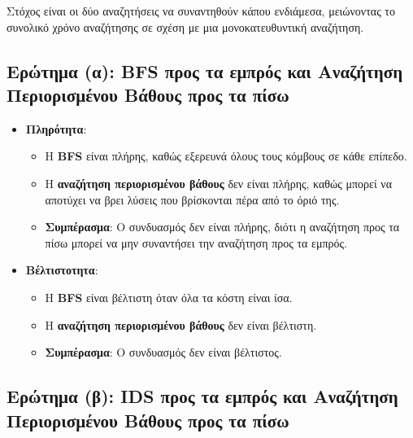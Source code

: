 \documentclass{article}
\begin{document}
Στόχος είναι οι δύο αναζητήσεις να συναντηθούν κάπου ενδιάμεσα, μειώνοντας το συνολικό χρόνο αναζήτησης σε σχέση με μια μονοκατευθυντική αναζήτηση.

\subsection*{Ερώτημα (α): BFS προς τα εμπρός και Αναζήτηση Περιορισμένου Βάθους προς τα πίσω}

\begin{itemize}
    \item \textbf{Πληρότητα}:
    \begin{itemize}
        \item Η \textbf{BFS} είναι πλήρης, καθώς εξερευνά όλους τους κόμβους σε κάθε επίπεδο.
        \item Η \textbf{αναζήτηση περιορισμένου βάθους} δεν είναι πλήρης, καθώς μπορεί να αποτύχει να βρει λύσεις που βρίσκονται πέρα από το όριό της.
        \item \textbf{Συμπέρασμα}: Ο συνδυασμός δεν είναι πλήρης, διότι η αναζήτηση προς τα πίσω μπορεί να μην συναντήσει την αναζήτηση προς τα εμπρός.
    \end{itemize}
    \item \textbf{Βέλτιστοτητα}:
    \begin{itemize}
        \item Η \textbf{BFS} είναι βέλτιστη όταν όλα τα κόστη είναι ίσα.
        \item Η \textbf{αναζήτηση περιορισμένου βάθους} δεν είναι βέλτιστη.
        \item \textbf{Συμπέρασμα}: Ο συνδυασμός δεν είναι βέλτιστος.
    \end{itemize}
\end{itemize}

\subsection*{Ερώτημα (β): IDS προς τα εμπρός και Αναζήτηση Περιορισμένου Βάθους προς τα πίσω}
\end{document}
